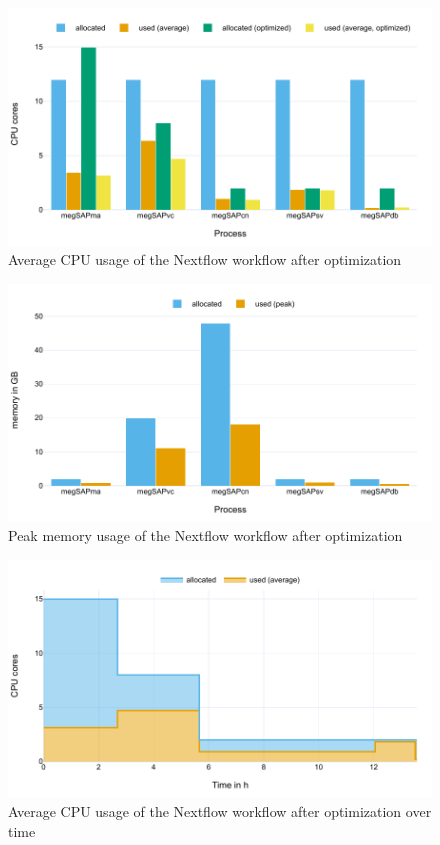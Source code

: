 \begin{figure}[H]
    \centering
	\includegraphics[width=\linewidth,height=\textheight,keepaspectratio]{pipeline_benchmark_CPU_v04}
	\caption{Average CPU usage of the Nextflow workflow after optimization}
	\label{figure:pipeline_benchmark_CPU_v04}
\end{figure}

\begin{figure}[H]
    \centering
	\includegraphics[width=\linewidth,height=\textheight,keepaspectratio]{pipeline_benchmark_memory_v04}
	\caption{Peak memory usage of the Nextflow workflow after optimization}
	\label{figure:pipeline_benchmark_memory_v04}
\end{figure}

\begin{figure}[H]
    \centering
	\includegraphics[width=\linewidth,height=\textheight,keepaspectratio]{pipeline_benchmark_CPU_v4_aoc}
	\caption{Average CPU usage of the Nextflow workflow after optimization over time}
	\label{figure:pipeline_benchmark_CPU_aoc_v04}
\end{figure}

